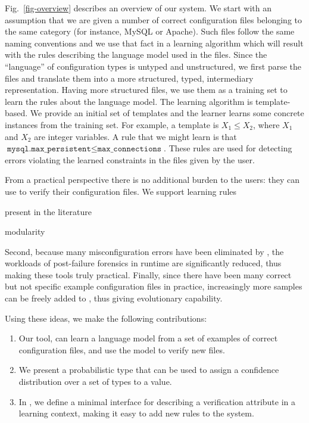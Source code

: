 Fig.~\ref{fig-overview} describes an overview of our system. We start with
an assumption that we are given a number of correct configuration files belonging to the same category (for instance, MySQL or Apache). Such files
follow the same naming conventions and we use that fact in a learning 
algorithm which will result with the rules describing the language model used in the files. Since the ``language'' of configuration types is untyped and unstructured, we first parse the files and translate them 
into a more structured, typed, intermediary representation. Having more structured files, we use them as a training set to learn the rules about the 
language model. The learning algorithm is template-based. We provide an initial set of
templates and the learner learns some concrete instances from 
the training set. For example, a template is $X_1 \le X_2$, where $X_1$ and $X_2$ are integer variables. A rule that we might learn is that
$\texttt{mysql.max\_persistent} \le \texttt{max\_connections}$.
These rules are used for detecting errors violating the learned constraints in the files given by the user.

From a  practical perspective there is no additional burden 
to the users: they can use \app to verify their configuration files.
We support learning rules 

present in the literature

modularity


Second, because many misconfiguration errors have been eliminated 
by \app, the workloads of post-failure forensics in runtime
are significantly reduced, thus making these tools truly practical.
Finally, since there have been many correct but not specific 
example configuration files in practice, 
increasingly more samples can be freely added to \app,
thus giving \app evolutionary capability.

Using these ideas, we make the following contributions:

\begin{enumerate}

  \item Our tool, \app can learn a language model from a set of examples of correct configuration files, and use the model to verify new files.
  \item We present a probabilistic type that can be used to assign a confidence distribution over a set of types to a value.
  \item In \app, we define a minimal interface for describing a verification attribute in a learning context, making it easy to add new rules to the system.

\end{enumerate}
